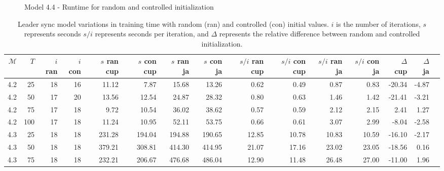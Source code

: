 \begin{figure}
    
    \caption{Model 4.4 - Runtime for random and controlled initialization}
    \label{fig:semirandom-cupaal-jajapy-4-4}
\end{figure}


\begin{table*}
    \centering
    \caption{Leader sync model variations in training time with random (ran) and controlled (con) initial values. $i$ is the number of iterations, $s$ represents seconds $s/i$ represents seconds per iteration, and $\Delta$ represents the relative difference between random and controlled initialization.}
    \label{tab:leader_results_rand_vs_semi}
    \begin{tabular}{rrrrrrrrrrrrrrr}
        \toprule
        $\mathcal{M}$ & $T$ & $i$ ran & $i$ con & $s$ ran cup & $s$ con cup & $s$ ran ja & $s$ con ja & $s/i$ ran cup & $s/i$ con cup & $s/i$ ran ja & $s/i$ con ja & $\Delta$ cup & $\Delta$ ja \\
        \midrule
        4.2           & 25  & 18      & 16      & 11.12       & 7.87        & 15.68      & 13.26      & 0.62          & 0.49          & 0.87         & 0.83         & -20.34       & -4.87       \\
        4.2           & 50  & 17      & 20      & 13.56       & 12.54       & 24.87      & 28.32      & 0.80          & 0.63          & 1.46         & 1.42         & -21.41       & -3.21       \\
        4.2           & 75  & 17      & 18      & 9.72        & 10.54       & 36.02      & 38.62      & 0.57          & 0.59          & 2.12         & 2.15         & 2.41         & 1.27        \\
        4.2           & 100 & 17      & 18      & 11.24       & 10.95       & 52.11      & 53.75      & 0.66          & 0.61          & 3.07         & 2.99         & -8.04        & -2.58       \\
        4.3           & 25  & 18      & 18      & 231.28      & 194.04      & 194.88     & 190.65     & 12.85         & 10.78         & 10.83        & 10.59        & -16.10       & -2.17       \\
        4.3           & 50  & 18      & 18      & 379.21      & 308.81      & 414.30     & 414.95     & 21.07         & 17.16         & 23.02        & 23.05        & -18.56       & 0.16        \\
        4.3           & 75  & 18      & 18      & 232.21      & 206.67      & 476.68     & 486.04     & 12.90         & 11.48         & 26.48        & 27.00        & -11.00       & 1.96        \\

\end{tabular}
\end{table*}
